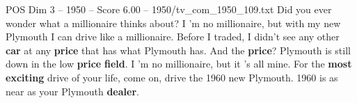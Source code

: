 \begin{textsample}{POS Dim 3 – 1950 – Score 6.00 – 1950/tv\_com\_1950\_109.txt}  \label{ex:f3_pos_005}
Did you ever wonder what a millionaire thinks about?
I 'm no millionaire, but with my new Plymouth I can drive like a millionaire.
Before I traded, I didn't see any other \textbf{car} at any \textbf{price} that has what Plymouth has.
And the \textbf{price}?
Plymouth is still down in the low \textbf{price} \textbf{field}.
I 'm no millionaire, but it 's all mine.
For the \textbf{most} \textbf{exciting} drive of your life, come on, drive the 1960 new Plymouth. 1960 is as near as your Plymouth \textbf{dealer}.

\end{textsample}
